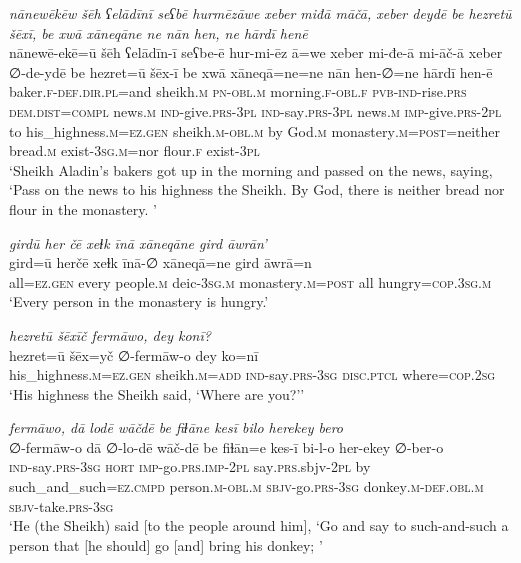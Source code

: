 \ea \label{HB.2}
\textit{nānewēkēw šēh ʕelādīnī seʕbē hurmēzāwe xeber miđā māčā, xeber deydē be hezretū šēxī, be xwā xāneqāne ne nān hen, ne hārdī henē} \\ 
\gll nānewē-ekē=ū šēh ʕelādīn-ī seʕbe-ē hur-mi-ēz ā=we xeber mi-đe-ā mi-āč-ā xeber ∅-de-ydē be hezret=ū šēx-ī be xwā xāneqā=ne=ne nān hen-∅=ne hārdī hen-ē \\ 
 baker\textsc{\textsc{.f}}\textsc{-def}\textsc{.dir}\textsc{.pl}=and sheikh\textsc{.m} \textsc{pn}\textsc{-obl}\textsc{.m} morning\textsc{\textsc{.f}}\textsc{-obl}\textsc{\textsc{.f}} \textsc{pvb-}\textsc{ind-}rise\textsc{.prs} \textsc{dem.dist}\textsc{=compl} news\textsc{.m} \textsc{ind-}give\textsc{.prs}\textsc{-3pl} \textsc{ind-}say\textsc{.prs}\textsc{-3pl} news\textsc{.m} \textsc{imp-}give\textsc{.prs}\textsc{-2pl} to his\_highness\textsc{.m}\textsc{=ez}\textsc{.gen} sheikh\textsc{.m}\textsc{-obl}\textsc{.m} by God\textsc{.m} monastery\textsc{.m}\textsc{=\textsc{post}}=neither bread\textsc{.m} exist\textsc{-3sg}\textsc{.m}=nor flour\textsc{\textsc{.f}} exist\textsc{-3pl} \\ 
\glt `Sheikh Aladin’s bakers got up in the morning and passed on the news, saying, ‘Pass on the news to his highness the Sheikh. By God, there is neither bread nor flour in the monastery. '
\z 
 
\ea \label{HB.5}
\textit{girdū her čē xeɫk īnā xāneqāne gird āwrān’} \\ 
\gll gird=ū herčē xeɫk īnā-∅ xāneqā=ne gird āwrā=n \\ 
 all\textsc{=ez}\textsc{.gen} every people\textsc{.m} deic\textsc{-3sg}\textsc{.m} monastery\textsc{.m}\textsc{=\textsc{post}} all hungry\textsc{=cop}\textsc{.3sg}\textsc{.m} \\ 
\glt `Every person in the monastery is hungry.'
\z 
 
\ea \label{HB.6}
\textit{hezretū šēxīč fermāwo, dey konī?} \\ 
\gll hezret=ū šēx=yč ∅-fermāw-o dey ko=nī \\ 
 his\_highness\textsc{.m}\textsc{=ez}\textsc{.gen} sheikh\textsc{.m}\textsc{=add} \textsc{ind-}say\textsc{.prs}\textsc{-3sg} \textsc{disc.ptcl} where\textsc{=cop}\textsc{.\textsc{2sg}} \\ 
\glt `His highness the Sheikh said, ‘Where are you?’'
\z 
 
\ea \label{HB.11}
\textit{fermāwo, dā lodē wāčdē be fiɫāne kesī bilo herekey bero} \\ 
\gll ∅-fermāw-o dā ∅-lo-dē wāč-dē be fiɫān=e kes-ī bi-l-o her-ekey ∅-ber-o \\ 
 \textsc{ind-}say\textsc{.prs}\textsc{-3sg} \textsc{hort} \textsc{imp-}go\textsc{.prs}\textsc{.imp}\textsc{-2pl} say\textsc{.prs}.sbjv\textsc{-2pl} by such\_and\_such\textsc{=ez}\textsc{.cmpd} person\textsc{.m}\textsc{-obl}\textsc{.m} \textsc{sbjv-}go\textsc{.prs}\textsc{-3sg} donkey\textsc{.m}\textsc{-def}\textsc{.obl}\textsc{.m} \textsc{sbjv-}take\textsc{.prs}\textsc{-3sg} \\ 
\glt `He (the Sheikh) said [to the people around him], ‘Go and say to such-and-such a person that [he should] go [and] bring his donkey; '
\z 
 
